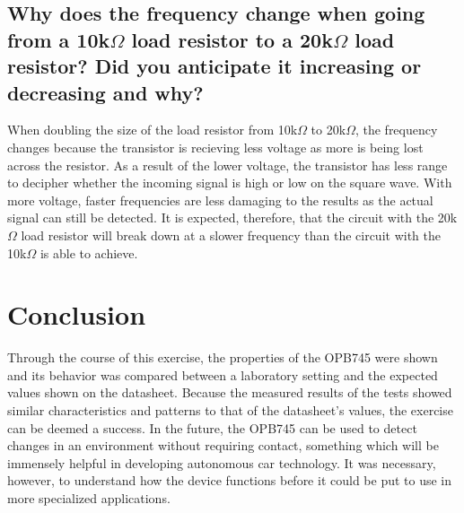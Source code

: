 \documentclass[conference]{IEEEtran}
\begin{document}
\subsection{Why does the frequency change when going from a 10k$\Omega$ load resistor to a 20k$\Omega$ load resistor?
Did you anticipate it increasing or decreasing and why?}

When doubling the size of the load resistor from 10k$\Omega$  to 20k$\Omega$, the frequency changes because the transistor is recieving
less voltage as more is being lost across the resistor. As a result of the lower voltage, the transistor has less range to decipher
whether the incoming signal is high or low on the square wave. With more voltage, faster frequencies are less damaging to the results as
the actual signal can still be detected. It is expected, therefore, that the circuit with the 20k$\Omega$ load resistor will break down
at a slower frequency than the circuit with the 10k$\Omega$ is able to achieve.

\section{Conclusion}
Through the course of this exercise, the properties of the OPB745 were shown and its behavior was compared between a laboratory
setting and the expected values shown on the datasheet. Because the measured results of the tests showed similar characteristics and
patterns to that of the datasheet's values, the exercise can be deemed a success. In the future, the OPB745 can be used to detect changes
in an environment without requiring contact, something which will be immensely helpful in developing autonomous car technology. It was
necessary, however, to understand how the device functions before it could be put to use in more specialized applications.
\end{document}
